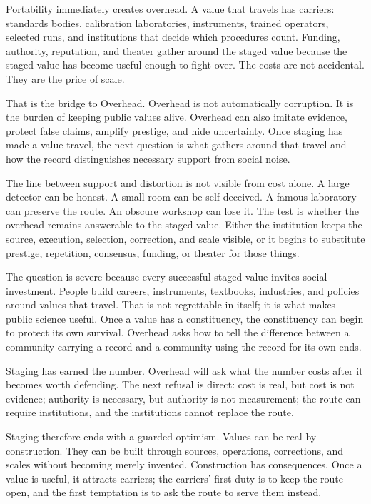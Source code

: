 \begin{movementclose}
Portability immediately creates overhead. A value that travels has
carriers: standards bodies, calibration laboratories, instruments,
trained operators, selected runs, and institutions that decide which
procedures count. Funding, authority, reputation, and theater gather
around the staged value because the staged value has become useful
enough to fight over. The costs are not accidental. They are the price
of scale.

That is the bridge to Overhead. Overhead is not automatically
corruption. It is the burden of keeping public values alive. Overhead
can also imitate evidence, protect false claims, amplify prestige, and
hide uncertainty. Once staging has made a value travel, the next
question is what gathers around that travel and how the record
distinguishes necessary support from social noise.

The line between support and distortion is not visible from cost alone.
A large detector can be honest. A small room can be self-deceived. A
famous laboratory can preserve the route. An obscure workshop can lose
it. The test is whether the overhead remains answerable to the staged
value. Either the institution keeps the source, execution, selection,
correction, and scale visible, or it begins to substitute prestige,
repetition, consensus, funding, or theater for those things.

The question is severe because every successful staged value invites
social investment. People build careers, instruments, textbooks,
industries, and policies around values that travel. That is not
regrettable in itself; it is what makes public science useful. Once a
value has a constituency, the constituency can begin to protect its own
survival. Overhead asks how to tell the difference between a community
carrying a record and a community using the record for its own ends.

Staging has earned the number. Overhead will ask what the number costs
after it becomes worth defending. The next refusal is direct: cost is
real, but cost is not evidence; authority is necessary, but authority is
not measurement; the route can require institutions, and the
institutions cannot replace the route.

Staging therefore ends with a guarded optimism. Values can be real by
construction. They can be built through sources, operations,
corrections, and scales without becoming merely invented. Construction
has consequences. Once a value is useful, it attracts carriers; the
carriers' first duty is to keep the route open, and the first temptation
is to ask the route to serve them instead.


\end{movementclose}
